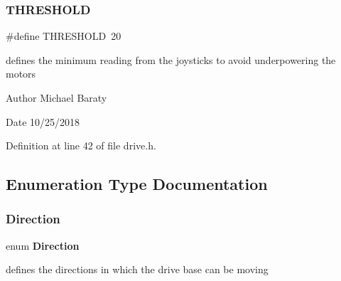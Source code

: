 \subsubsection{T\+H\+R\+E\+S\+H\+O\+LD}
{\footnotesize\ttfamily \#define T\+H\+R\+E\+S\+H\+O\+LD~20}



defines the minimum reading from the joysticks to avoid underpowering the motors 

\begin{DoxyAuthor}{Author}
Michael Baraty 
\end{DoxyAuthor}
\begin{DoxyDate}{Date}
10/25/2018 
\end{DoxyDate}


Definition at line 42 of file drive.\+h.



\subsection{Enumeration Type Documentation}
\mbox{\label{drive_8h_a224b9163917ac32fc95a60d8c1eec3aa}} 
\subsubsection{Direction}
{\footnotesize\ttfamily enum \textbf{ Direction}}



defines the directions in which the drive base can be moving 


